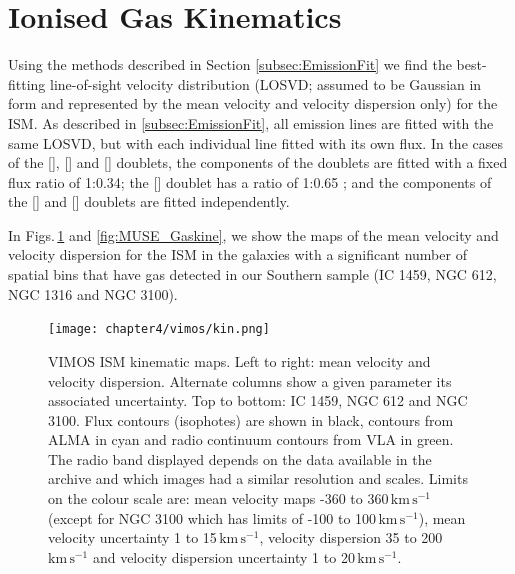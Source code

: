 \section{Ionised Gas Kinematics}
	\label{sec:GasKin}
	Using the methods described in Section \ref{subsec:EmissionFit} we find the best-fitting line-of-sight velocity distribution (LOSVD; assumed to be Gaussian in form and represented by the mean velocity and velocity dispersion only) for the ISM. As described in \ref{subsec:EmissionFit}, all emission lines are fitted with the same LOSVD, but with each individual line fitted with its own flux. In the cases of the [], [] and [] doublets, the components of the doublets are fitted with a fixed flux ratio of 1:0.34; the [] doublet has a ratio of 1:0.65 \citep{Safier1992}; and the components of the [] and [] doublets are fitted independently.

	In Figs.\,\ref{fig:VIMOS_Gaskine} and \ref{fig:MUSE_Gaskine}, we show the maps of the mean velocity and velocity dispersion for the ISM in the galaxies with a significant number of spatial bins that have gas detected in our Southern sample (IC 1459, NGC 612, NGC 1316 and NGC 3100). 

	\begin{figure}
		\centering
		\texttt{[image: chapter4/vimos/kin.png]}
		\caption[VIMOS ISM kinematic maps]{VIMOS ISM kinematic maps. Left to right: mean velocity and velocity dispersion. Alternate columns show a given parameter its associated uncertainty. Top to bottom: IC 1459, NGC 612 and NGC 3100. Flux contours (isophotes) are shown in black,  contours from ALMA in cyan and radio continuum contours from VLA in green. The radio band displayed depends on the data available in the archive and which images had a similar resolution and scales. Limits on the colour scale are: mean velocity maps -360 to 360\,$\mathrm{km \, s^{-1}}$ (except for NGC 3100 which has limits of -100 to 100\,$\mathrm{km \, s^{-1}}$), mean velocity uncertainty 1 to 15\,$\mathrm{km \, s^{-1}}$, velocity dispersion 35 to 200\,$\mathrm{km \, s^{-1}}$ and velocity dispersion uncertainty 1 to 20\,$\mathrm{km \, s^{-1}}$.} 
		\label{fig:VIMOS_Gaskine}
	\end{figure}

